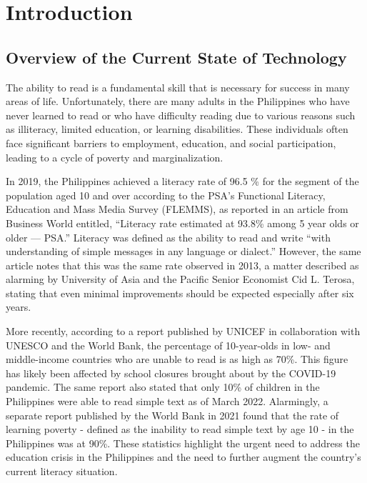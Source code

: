 \chapter{Introduction}
\label{sec:researchdesc}    %

\section{Overview of the Current State of Technology}
\label{sec:overview}

The ability to read is a fundamental skill that is necessary for success in many areas of life. Unfortunately, there are many adults in the Philippines who have never learned to read or who have difficulty reading due to various reasons such as illiteracy, limited education, or learning disabilities. These individuals often face significant barriers to employment, education, and social participation, leading to a cycle of poverty and marginalization.

In 2019, the Philippines achieved a literacy rate of 96.5 \% for the segment of the population aged 10 and over according to the PSA’s Functional Literacy, Education and Mass Media Survey (FLEMMS), as reported in an article from Business World entitled, “Literacy rate estimated at 93.8\% among 5 year olds or older — PSA.” Literacy was defined as the ability to read and write “with understanding of simple messages in any language or dialect.” However, the same article notes that this was the same rate observed in 2013, a matter described as alarming by University of Asia and the Pacific Senior Economist Cid L. Terosa, stating that even minimal improvements should be expected especially after six years.

More recently, according to a report published by UNICEF in collaboration with UNESCO and the World Bank, the percentage of 10-year-olds in low- and middle-income countries who are unable to read is as high as 70\%. This figure has likely been affected by school closures brought about by the COVID-19 pandemic. The same report also stated that only 10\% of children in the Philippines were able to read simple text as of March 2022. Alarmingly, a separate report published by the World Bank in 2021 found that the rate of learning poverty - defined as the inability to read simple text by age 10 - in the Philippines was at 90\%. These statistics highlight the urgent need to address the education crisis in the Philippines and the need to further augment the country’s current literacy situation.

